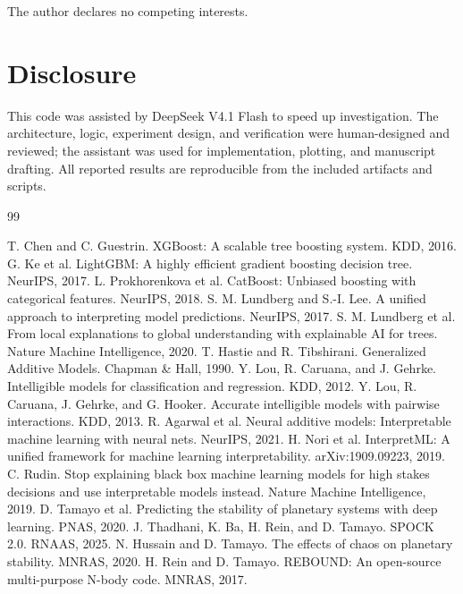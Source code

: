 \documentclass[twoside,11pt]{article}
\begin{document}
The author declares no competing interests.

\section*{Disclosure}

This code was assisted by DeepSeek V4.1 Flash to speed up investigation. The
architecture, logic, experiment design, and verification were human-designed and
reviewed; the assistant was used for implementation, plotting, and manuscript
drafting. All reported results are reproducible from the included artifacts and
scripts.

\begin{thebibliography}{99}
\small\raggedright
{} T. Chen and C. Guestrin. XGBoost: A scalable tree boosting system. KDD, 2016.
 G. Ke et al. LightGBM: A highly efficient gradient boosting decision tree. NeurIPS, 2017.
 L. Prokhorenkova et al. CatBoost: Unbiased boosting with categorical features. NeurIPS, 2018.
 S. M. Lundberg and S.-I. Lee. A unified approach to interpreting model predictions. NeurIPS, 2017.
 S. M. Lundberg et al. From local explanations to global understanding with explainable AI for trees. Nature Machine Intelligence, 2020.
 T. Hastie and R. Tibshirani. Generalized Additive Models. Chapman \& Hall, 1990.
 Y. Lou, R. Caruana, and J. Gehrke. Intelligible models for classification and regression. KDD, 2012.
 Y. Lou, R. Caruana, J. Gehrke, and G. Hooker. Accurate intelligible models with pairwise interactions. KDD, 2013.
 R. Agarwal et al. Neural additive models: Interpretable machine learning with neural nets. NeurIPS, 2021.
 H. Nori et al. InterpretML: A unified framework for machine learning interpretability. arXiv:1909.09223, 2019.
 C. Rudin. Stop explaining black box machine learning models for high stakes decisions and use interpretable models instead. Nature Machine Intelligence, 2019.
 D. Tamayo et al. Predicting the stability of planetary systems with deep learning. PNAS, 2020.
 J. Thadhani, K. Ba, H. Rein, and D. Tamayo. SPOCK 2.0. RNAAS, 2025.
 N. Hussain and D. Tamayo. The effects of chaos on planetary stability. MNRAS, 2020.
 H. Rein and D. Tamayo. REBOUND: An open-source multi-purpose N-body code. MNRAS, 2017.
\end{thebibliography}
\end{document}
